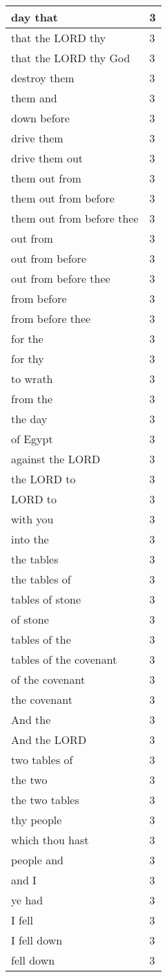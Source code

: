 \begin{center}
\begin{longtable}{|p{3.0in}|p{0.5in}|}
day that & 3\\ \hline 
that the LORD thy & 3\\ \hline 
that the LORD thy God & 3\\ \hline 
destroy them & 3\\ \hline 
them and & 3\\ \hline 
down before & 3\\ \hline 
drive them & 3\\ \hline 
drive them out & 3\\ \hline 
them out from & 3\\ \hline 
them out from before & 3\\ \hline 
them out from before thee & 3\\ \hline 
out from & 3\\ \hline 
out from before & 3\\ \hline 
out from before thee & 3\\ \hline 
from before & 3\\ \hline 
from before thee & 3\\ \hline 
for the & 3\\ \hline 
for thy & 3\\ \hline 
to wrath & 3\\ \hline 
from the & 3\\ \hline 
the day & 3\\ \hline 
of Egypt & 3\\ \hline 
against the LORD & 3\\ \hline 
the LORD to & 3\\ \hline 
LORD to & 3\\ \hline 
with you & 3\\ \hline 
into the & 3\\ \hline 
the tables & 3\\ \hline 
the tables of & 3\\ \hline 
tables of stone & 3\\ \hline 
of stone & 3\\ \hline 
tables of the & 3\\ \hline 
tables of the covenant & 3\\ \hline 
of the covenant & 3\\ \hline 
the covenant & 3\\ \hline 
And the & 3\\ \hline 
And the LORD & 3\\ \hline 
two tables of & 3\\ \hline 
the two & 3\\ \hline 
the two tables & 3\\ \hline 
thy people & 3\\ \hline 
which thou hast & 3\\ \hline 
people and & 3\\ \hline 
and I & 3\\ \hline 
ye had & 3\\ \hline 
I fell & 3\\ \hline 
I fell down & 3\\ \hline 
fell down & 3\\ \hline 
\end{longtable}
\end{center}





